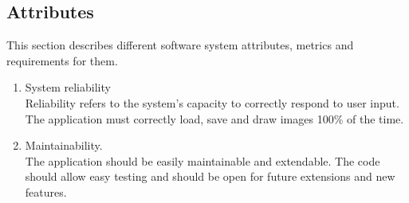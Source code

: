 \documentclass{article}
\begin{document}
\subsection{Attributes}
This section describes different software system attributes, metrics and requirements for them.
\begin{enumerate}
\item System reliability
\\
Reliability refers to the system's capacity to correctly respond to user input.
The application must correctly load, save and draw images 100\% of the time.
\item Maintainability.
\\
The application should be easily maintainable and extendable.
The code should allow easy testing and should be open for future extensions and new features. 
\end{enumerate}
\end{document}
